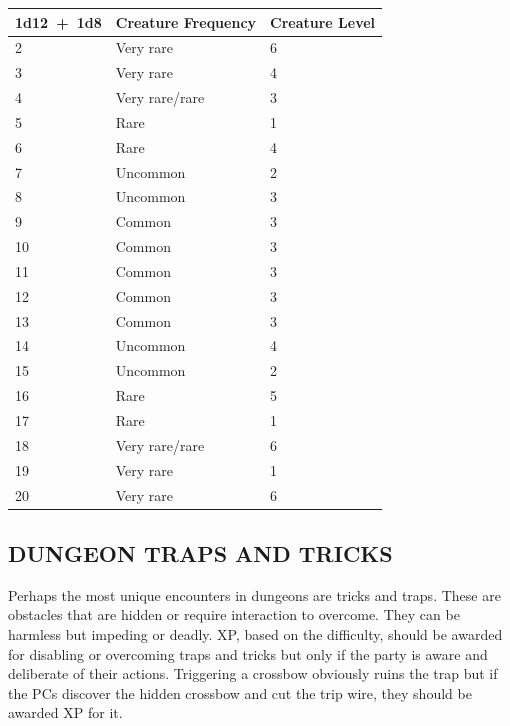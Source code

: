 \begin{multicols}{2}
\begin{minipage}{\columnwidth}
\label{sampledungeon3}
\noindent
\begin{tabular}{|p{}|p{}|p{}|}
\hline
1d12~+~1d8	& Creature Frequency	& Creature Level \\
\hline\hline
\rowcolor[gray]{.9}2	& Very rare	& 6 \\
3	& Very rare	& 4 \\
\rowcolor[gray]{.9}4	& Very rare/rare	& 3 \\
5	& Rare	& 1 \\
\rowcolor[gray]{.9}6	& Rare	& 4 \\
7	& Uncommon	& 2 \\
\rowcolor[gray]{.9}8	& Uncommon	& 3 \\
9	& Common	& 3 \\
\rowcolor[gray]{.9}10	& Common	& 3 \\
11	& Common	& 3 \\
\rowcolor[gray]{.9}12	& Common	& 3 \\
13	& Common	& 3 \\
\rowcolor[gray]{.9}14	& Uncommon	& 4 \\
15	& Uncommon	& 2 \\
\rowcolor[gray]{.9}16	& Rare	& 5 \\
17	& Rare	& 1 \\
\rowcolor[gray]{.9}18	& Very rare/rare	& 6 \\
19	& Very rare	& 1 \\
\rowcolor[gray]{.9}20	& Very rare	& 6 \\
\hline
\end{tabular}

\end{minipage}

\subsection{DUNGEON TRAPS AND TRICKS}

Perhaps the most unique encounters in dungeons are tricks and traps.  These are obstacles that are hidden or require interaction to overcome.  They can be harmless but impeding or deadly.  XP, based on the difficulty, should be awarded for disabling or overcoming traps and tricks but only if the party is aware and deliberate of their actions.  Triggering a crossbow obviously ruins the trap but if the PCs discover the hidden crossbow and cut the trip wire, they should be awarded XP for it.


\end{multicols}
